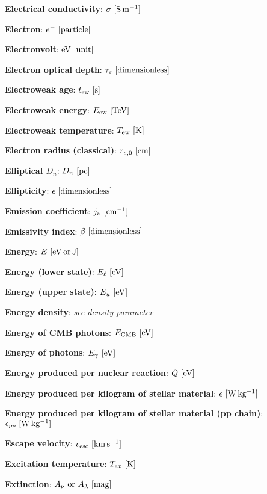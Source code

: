 \documentclass[a4paper,10pt]{article}
\begin{document}
{\noindent}\textbf{Electrical conductivity}: $\sigma ~ [{\rm S\,m^{-1}}]$

{\noindent}\textbf{Electron}: $e^- ~ [{\rm particle}]$

{\noindent}\textbf{Electronvolt}: ${\rm eV} ~ [{\rm unit}]$

{\noindent}\textbf{Electron optical depth}: $\tau_e ~ [{\rm dimensionless}]$

{\noindent}\textbf{Electroweak age}: $t_\mathrm{ew} ~ [{\rm s}]$

{\noindent}\textbf{Electroweak energy}: $E_\mathrm{ew} ~ [{\rm TeV}]$

{\noindent}\textbf{Electroweak temperature}: $T_\mathrm{ew} ~ [{\rm K}]$

{\noindent}\textbf{Electron radius (classical)}: $r_{e,0} ~ [{\rm cm}]$

{\noindent}\textbf{Elliptical $D_n$}: $D_n ~ [{\rm pc}]$

{\noindent}\textbf{Ellipticity}: $\epsilon ~ [{\rm dimensionless}]$

{\noindent}\textbf{Emission coefficient}: $j_\nu ~ [{\rm cm^{-1}}]$

{\noindent}\textbf{Emissivity index}: $\beta ~ [{\rm dimensionless}]$

{\noindent}\textbf{Energy}: $E ~ [{\rm eV\,or\,J}]$

{\noindent}\textbf{Energy (lower state)}: $E_\ell ~ [{\rm eV}]$

{\noindent}\textbf{Energy (upper state)}: $E_u ~ [{\rm eV}]$

{\noindent}\textbf{Energy density}: \textit{see density parameter}

{\noindent}\textbf{Energy of CMB photons}: $E_\mathrm{CMB} ~ [{\rm eV}]$

{\noindent}\textbf{Energy of photons}: $E_\gamma ~ [{\rm eV}]$

{\noindent}\textbf{Energy produced per nuclear reaction}: $Q ~ [{\rm eV}]$

{\noindent}\textbf{Energy produced per kilogram of stellar material}: $\epsilon ~ [{\rm W\,kg^{-1}}]$

{\noindent}\textbf{Energy produced per kilogram of stellar material (pp chain)}: $\epsilon_{pp} ~ [{\rm W\,kg^{-1}}]$

{\noindent}\textbf{Escape velocity}: $v_\mathrm{esc} ~ [{\rm km\,s^{-1}}]$

{\noindent}\textbf{Excitation temperature}: $T_{ex} ~ [{\rm K}]$

{\noindent}\textbf{Extinction}: $A_\nu~{\rm or}~A_\lambda ~ [{\rm mag}]$
\end{document}
